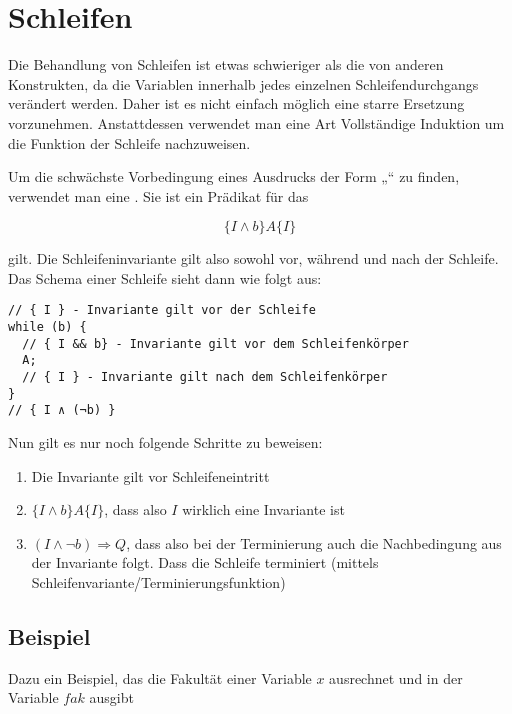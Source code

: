 \documentclass{bschlangaul-haupt}
\begin{document}
\section{Schleifen}

Die Behandlung von Schleifen ist etwas schwieriger als die von anderen
Konstrukten, da die Variablen innerhalb jedes einzelnen
Schleifendurchgangs verändert werden. Daher ist es nicht einfach möglich
eine starre Ersetzung vorzunehmen. Anstattdessen verwendet man eine Art
Vollständige Induktion um die Funktion der Schleife nachzuweisen.

Um die schwächste Vorbedingung eines Ausdrucks der Form
„“ zu finden, verwendet man eine
. Sie ist ein Prädikat für das

\begin{displaymath}
\{ I \wedge b \} A \{ I \}
\end{displaymath}

\noindent
gilt. Die Schleifeninvariante gilt also sowohl vor, während und nach der
Schleife. Das Schema einer Schleife sieht dann wie folgt aus:

\begin{verbatim}
// { I } - Invariante gilt vor der Schleife
while (b) {
  // { I && b} - Invariante gilt vor dem Schleifenkörper
  A;
  // { I } - Invariante gilt nach dem Schleifenkörper
}
// { I ∧ (¬b) }
\end{verbatim}

\noindent
Nun gilt es nur noch folgende Schritte zu beweisen:

\begin{enumerate}
\item Die Invariante gilt vor Schleifeneintritt

\item $\{ I \wedge b \} A \{ I \}$, dass also $I$ wirklich eine
Invariante ist

\item $(I \wedge \neg b) \Rightarrow Q$, dass also bei der Terminierung
auch die Nachbedingung aus der Invariante folgt. Dass die Schleife
terminiert (mittels Schleifenvariante/Terminierungsfunktion)
\end{enumerate}

\subsection{Beispiel}

Dazu ein Beispiel, das die Fakultät einer Variable $x$ ausrechnet und in
der Variable $fak$ ausgibt
\end{document}
